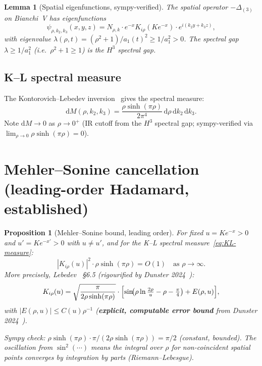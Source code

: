 \documentclass[11pt]{article}
\newtheorem{lemma}[theorem]{Lemma}
\newtheorem{proposition}[theorem]{Proposition}
\theoremstyle{definition}
\begin{document}
\begin{lemma}[Spatial eigenfunctions, sympy-verified]\label{lem:eigenfunc}
The spatial operator $-\Delta_{(3)}$ on Bianchi~V has eigenfunctions
\[
\psi_{\rho,k_2,k_3}(x,y,z) = N_{\rho,k} \cdot e^{-x} K_{i\rho}(Ke^{-x}) \cdot e^{i(k_2 y + k_3 z)},
\]
with eigenvalue $\lambda(\rho,t) = (\rho^2+1)/a_1(t)^2 \ge 1/a_1^2 > 0$.
The spectral gap $\lambda \ge 1/a_1^2$ (i.e.\ $\rho^2 + 1 \ge 1$) is the $H^3$ spectral gap.
\end{lemma}

\subsection{K--L spectral measure}

The Kontorovich--Lebedev inversion~\cite{Lebedev1965} gives the spectral measure:
\begin{equation}\label{eq:KL-measure}
\mathrm{d}M(\rho,k_2,k_3) = \frac{\rho\sinh(\pi\rho)}{2\pi^4}\,\mathrm{d}\rho\,\mathrm{d}k_2\,\mathrm{d}k_3.
\end{equation}
Note $\mathrm{d}M \to 0$ as $\rho \to 0^+$ (IR cutoff from the $H^3$ spectral gap;
sympy-verified via $\lim_{\rho\to 0}\rho\sinh(\pi\rho) = 0$).

\section{Mehler--Sonine cancellation (leading-order Hadamard, established)}\label{sec:MS}

\begin{proposition}[Mehler--Sonine bound, leading order]\label{prop:MS}
For fixed $u = Ke^{-x} > 0$ and $u' = Ke^{-x'} > 0$ with $u \ne u'$, and
for the K--L spectral measure~\eqref{eq:KL-measure}:
\begin{equation}
|K_{i\rho}(u)|^2 \cdot \rho\sinh(\pi\rho) = O(1) \quad\text{as }\rho\to\infty.
\end{equation}
More precisely, Lebedev~\cite{Lebedev1965} \S6.5 (rigourified by Dunster 2024~\cite{Dunster2024}):
\begin{equation}\label{eq:MS-asymp}
K_{i\rho}(u) = \sqrt{\frac{\pi}{2\rho\sinh(\pi\rho)}} \cdot
  \Bigl[\sin\!\bigl(\rho\ln\tfrac{2\rho}{u} - \rho - \tfrac\pi4\bigr) + E(\rho,u)\Bigr],
\end{equation}
with $|E(\rho,u)| \le C(u)\rho^{-1}$ (\textbf{explicit, computable error bound} from
Dunster 2024~\cite{Dunster2024}).

\emph{Sympy check}: $\rho\sinh(\pi\rho)\cdot\pi/(2\rho\sinh(\pi\rho)) = \pi/2$
(constant, bounded). The oscillation from $\sin^2(\cdots)$ means the integral over
$\rho$ for non-coincident spatial points converges by integration by parts (Riemann--Lebesgue).
\end{proposition}
\end{document}
